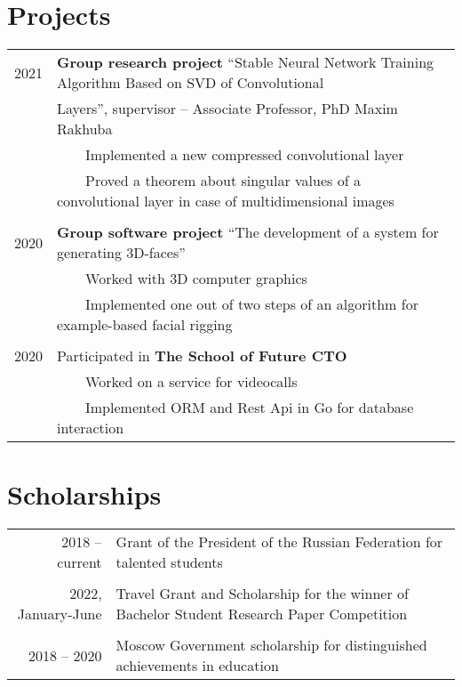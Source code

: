 \documentclass[a4paper,10pt]{article}
\newcommand{\tabitem}{~~\llap{\textbullet}~~}
\begin{document}
\section{Projects}
\begin{longtable}{rl}
\hspace{0.9cm} 2021 & \textbf{Group research project} ``Stable Neural Network Training Algorithm Based on SVD of Convolutional \\
&  Layers'', supervisor -- Associate Professor, PhD Maxim Rakhuba \\
& \tabitem Implemented a new compressed convolutional layer \\
& \tabitem Proved a theorem about singular values of a convolutional layer in case of multidimensional images \\
& \\
\hspace{0.9cm} 2020 & \textbf{Group software project} ``The development of a system for generating 3D-faces'' \\
& \tabitem Worked with 3D computer graphics \\
& \tabitem Implemented one out of two steps of an algorithm for example-based facial rigging\\
&\\
\hspace{0.9cm} 2020 & Participated in \textbf{The School of Future CTO} \\
& \tabitem Worked on a service for videocalls \\
& \tabitem Implemented ORM and Rest Api in Go for database interaction \\
\end{longtable}

\section{Scholarships}
\begin{tabular}{rl}
2018 -- current & Grant of the President of the Russian Federation for talented students \\
&\\
2022, January-June & Travel Grant and Scholarship for the winner of Bachelor Student Research Paper Competition\\
&\\
2018 -- 2020 & Moscow Government scholarship for distinguished achievements in education \\
\end{tabular}
\end{document}
